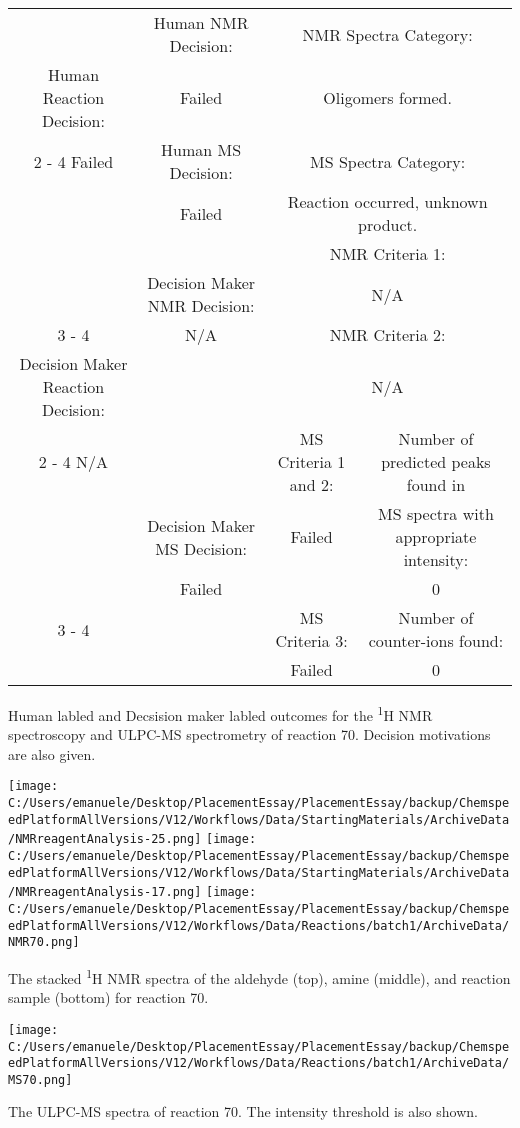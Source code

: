 \documentclass{article}%
\begin{document}
\begin{Decision Table}[H]%
\begin{tabular}{|c|c|c|c|}%
\hline%
&Human NMR Decision:&\multicolumn{2}{|c|}{NMR Spectra Category:}\\%
Human Reaction Decision:&Failed&\multicolumn{2}{|c|}{Oligomers formed.}\\%
\cline{2%
-%
4}%
Failed&Human MS Decision:&\multicolumn{2}{|c|}{MS Spectra Category:}\\%
&Failed&\multicolumn{2}{|c|}{Reaction occurred, unknown product.}\\%
\hline%
&&\multicolumn{2}{|c|}{NMR Criteria 1:}\\%
&Decision Maker NMR Decision:&\multicolumn{2}{|c|}{N/A}\\%
\cline{3%
-%
4}%
&N/A&\multicolumn{2}{|c|}{NMR Criteria 2:}\\%
Decision Maker Reaction Decision:&&\multicolumn{2}{|c|}{N/A}\\%
\cline{2%
-%
4}%
N/A&&MS Criteria 1 and 2:&Number of predicted peaks found in\\%
&Decision Maker MS Decision:&Failed&MS spectra with appropriate intensity:\\%
&Failed&&0\\%
\cline{3%
-%
4}%
&&MS Criteria 3:&Number of counter{-}ions found:\\%
&&Failed&0\\%
\hline%
\end{tabular}%
\caption{Human labled and Decsision maker labled outcomes for the \textsuperscript{1}H NMR spectroscopy and ULPC-MS spectrometry of reaction 70. Decision motivations are also given.}%
\end{Decision Table}%
\begin{NMR Spectra}[H]%
\begin{center}%
\texttt{[image: C:/Users/emanuele/Desktop/PlacementEssay/PlacementEssay/backup/ChemspeedPlatformAllVersions/V12/Workflows/Data/StartingMaterials/ArchiveData/NMRreagentAnalysis-25.png]}\hfill%
\texttt{[image: C:/Users/emanuele/Desktop/PlacementEssay/PlacementEssay/backup/ChemspeedPlatformAllVersions/V12/Workflows/Data/StartingMaterials/ArchiveData/NMRreagentAnalysis-17.png]}\hfill%
\texttt{[image: C:/Users/emanuele/Desktop/PlacementEssay/PlacementEssay/backup/ChemspeedPlatformAllVersions/V12/Workflows/Data/Reactions/batch1/ArchiveData/NMR70.png]}\hfill%
\end{center}%
\caption{The stacked \textsuperscript{1}H NMR spectra of the aldehyde (top), amine (middle), and reaction sample (bottom) for reaction 70.}%
\end{NMR Spectra}%
\begin{MS Spectra}[H]%
\begin{center}%
\texttt{[image: C:/Users/emanuele/Desktop/PlacementEssay/PlacementEssay/backup/ChemspeedPlatformAllVersions/V12/Workflows/Data/Reactions/batch1/ArchiveData/MS70.png]}\hfill%
\end{center}%
\caption{The ULPC-MS spectra of reaction 70. The intensity threshold is also shown.}%
\end{MS Spectra}%
\end{document}
